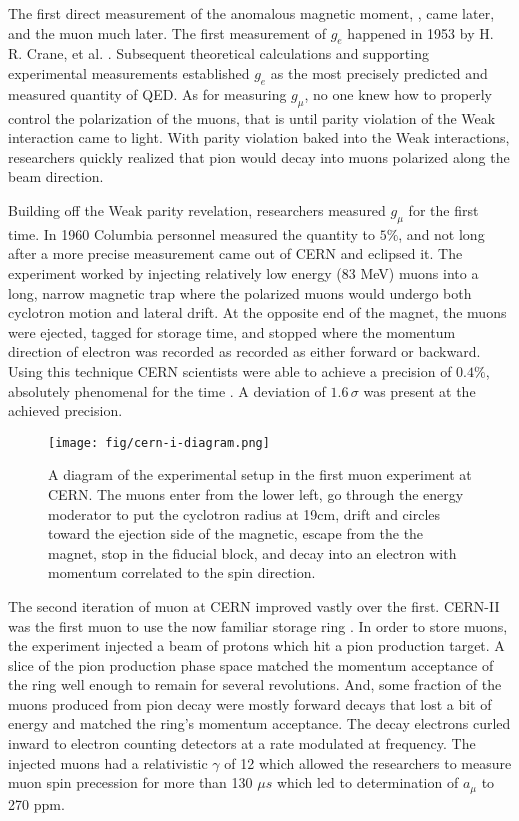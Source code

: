 The first direct measurement of the anomalous magnetic moment, \gmtwo, came later, and the muon \gmtwo much later.  The first measurement of $g_e$ happened in 1953 by H. R. Crane, et al. .  Subsequent theoretical calculations and supporting experimental measurements established $g_e$ as the most precisely predicted and measured quantity of QED.  As for measuring $g_\mu$, no one knew how to properly control the polarization of the muons, that is until parity violation of the Weak interaction came to light.  With parity violation baked into the Weak interactions, researchers quickly realized that pion would decay into muons polarized along the beam direction.  

Building off the Weak parity revelation, researchers measured $g_\mu$ for the first time.  In 1960 Columbia personnel measured the quantity to $5\%$, and not long after a more precise measurement came out of CERN and eclipsed it.  The experiment worked by injecting relatively low energy (83 MeV) muons into a long, narrow magnetic trap where the polarized muons would undergo both cyclotron motion and lateral drift. At the opposite end of the magnet, the muons were ejected, tagged for storage time, and stopped where the momentum direction of electron was recorded as recorded as either forward or backward.  Using this technique CERN scientists were able to achieve a precision of $0.4\%$, absolutely phenomenal for the time \cite{cern-i}.  A deviation of $1.6\,\sigma$ was present at the achieved precision.

\begin{figure}
\centering
\texttt{[image: fig/cern-i-diagram.png]}
\label{fig:cern-i-diagram}
\caption{A diagram of the experimental setup in the first muon \gmtwo experiment at CERN. The muons enter from the lower left, go through the energy moderator to put the cyclotron radius at 19cm, drift and circles toward the ejection side of the magnetic, escape from the the magnet, stop in the fiducial block, and decay into an electron with momentum correlated to the spin direction.}
\end{figure}

The second iteration of muon \gmtwo at CERN improved vastly over the first.  CERN-II was the first muon \gmtwo to use the now familiar storage ring \cite{47y-muon-g-2}.  In order to store muons, the experiment injected a beam of protons which hit a pion production target.  A slice of the pion production phase space matched the momentum acceptance of the ring well enough to remain for several revolutions. And, some fraction of the muons produced from pion decay were mostly forward decays that lost a bit of energy and matched the ring's momentum acceptance.  The decay electrons curled inward to electron counting detectors at a rate modulated at \gmtwo frequency.  The injected muons had a relativistic $\gamma$ of 12 which allowed the researchers to measure muon spin precession for more than 130 $\mu s$ which led to determination of $a_\mu$ to 270 ppm.

